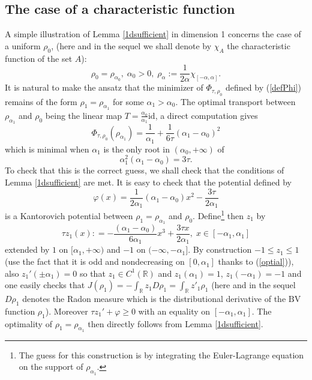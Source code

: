 \documentclass[12pt, a4paper]{article}
\numberwithin{equation}{section}
\theoremstyle{plain}
\theoremstyle{definition}
\theoremstyle{remark}
\newcommand{\R}{\mathbb{R}}
\newcommand{\BV}{\mathrm{BV}}
\newcommand{\id}{\mathrm{id}}
\newcommand\pref[1]{(\ref{#1})}
\begin{document}
\subsection{The case of a characteristic function}\label{subsec-charac}


A simple  illustration of  Lemma \ref{1dsufficient} in dimension 1 concerns the case of a uniform $\rho_0$, (here and in the sequel we shall denote by $\chi_A$ the characteristic function of the set $A$):
\[\rho_{0}=\rho_{\alpha_0}, \; \alpha_0 >0, \; \rho_{\alpha}:=\frac{1}{2\alpha} \chi_{[-\alpha, \alpha]}.\]
It is natural to make the ansatz that the minimizer of $\Phi_{\tau, \rho_0}$ defined by \pref{defPhi} remains of the form $\rho_1=\rho_{\alpha_1}$ for some $\alpha_1>\alpha_0$. The optimal transport between $\rho_{\alpha_1}$ and $\rho_0$ being the linear map $T=\frac{\alpha_0}{\alpha_1} \id$, a direct computation gives
\[\Phi_{\tau, \rho_0}(\rho_{\alpha_1})=\frac{1}{\alpha_1} +\frac{1}{6\tau}(\alpha_1-\alpha_0)^2\]
which is minimal when $\alpha_1$ is the only root in $(\alpha_0, +\infty)$ of 
\begin{equation}\label{optial}
\alpha_1^2(\alpha_1-\alpha_0)=3\tau.
\end{equation}
To check that this is the  correct guess, we shall check that the conditions of Lemma \ref{1dsufficient} are met. It is easy to check that the potential defined by
\[\varphi(x)=\frac{1}{2\alpha_1} (\alpha_1-\alpha_0) x^2-\frac{3\tau }{2 \alpha_1}\]
is a Kantorovich potential between $\rho_1=\rho_{\alpha_1}$ and $\rho_0$.  Define\footnote{The guess for this construction is by integrating the Euler-Lagrange equation on the support of $\rho_{\alpha_1}$.} then $z_1$ by 
\[\tau z_1(x): =-\frac{(\alpha_1-\alpha_0)}{6\alpha_1} x^3+\frac{3 \tau x} {2 \alpha_1} , \; x\in [-\alpha_1, \alpha_1]\]
extended by $1$ on $[\alpha_1, +\infty)$ and $-1$ on $(-\infty, -\alpha_1]$.  By construction $-1\le z_1\le 1$ (use the fact that it is odd and nondecreasing on $[0, \alpha_1]$ thanks to \pref{optial}), also $z_1'(\pm \alpha_1)=0$ so that $z_1 \in C^1(\R)$ and $z_1(\alpha_1)=1$, $z_1(-\alpha_1)=-1$ and one easily checks that $J(\rho_1)=-\int_{\R} z_1  D \rho_1=\int_{\R} z'_1 \rho_1$ (here and in the sequel $D\rho_1$ denotes the Radon measure which is the  distributional derivative of the $\BV$ function $\rho_1$). Moreover $\tau z_1'+\varphi\ge 0$ with an equality on $[-\alpha_1, \alpha_1]$. The optimality of $\rho_1=\rho_{\alpha_1}$ then directly follows from  Lemma \ref{1dsufficient}. 


\smallskip
\end{document}
